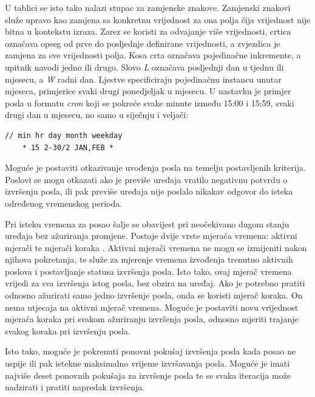 U tablici se isto tako nalazi stupac za zamjenske znakove. Zamjenski znakovi  služe upravo kao zamjena sa konkretnu vrijednost za ona polja čija vrijednost nije bitna u kontekstu izraza. Zarez se koristi za odvajanje više vrijednosti, crtica označava opseg od prve do posljednje definirane vrijednosti, a zvjezdica je zamjena za sve vrijednosti polja. Kosa crta označava pojedinačne inkremente, a upitnik navodi jedno ili drugo. Slovo \textit{L} označava posljednji dan u tjednu ili mjesecu, a \textit{W} radni dan. Ljestve specificiraju pojedinačnu instancu unutar mjeseca, primjerice svaki drugi ponedjeljak u mjesecu. U nastavku je primjer posla u formatu \textit{cron} koji se pokreće svake minute između 15:00 i 15:59, svaki drugi dan u mjesecu, no samo u siječnju i veljači:

\begin{lstlisting}[caption={Primjer formata tipa \textit{cron}}]
// min hr day month weekday
	* 15 2-30/2 JAN,FEB *
\end{lstlisting}

Moguće je postaviti otkazivanje uvođenja posla na temelju postavljenih kriterija. Poslovi se mogu otkazati ako je previše uređaja vratilo negativnu potvrdu o izvršenju posla, ili pak previše uređaja nije poslalo nikakav odgovor do isteka određenog vremenskog perioda. 

Pri isteku vremena  za posao šalje se obavijest pri neočekivano dugom stanju uređaja bez ažuriranja promjene. Postoje dvije vrste mjerača vremena: aktivni mjerači  te mjerači koraka . Aktivni mjerači vremena ne mogu se izmijeniti nakon njihova pokretanja, te služe za mjerenje vremena izvođenja trenutno aktivnih poslova i postavljanje statusa izvršenja posla. Isto tako, ovaj mjerač vremena vrijedi za sva izvršenja istog posla, bez obzira na uređaj. Ako je potrebno pratiti odnosno ažurirati samo jedno izvršenje posla, onda se koristi mjerač koraka. On nema utjecaja na aktivni mjerač vremena. Moguće je postaviti novu vrijednost mjerača koraka pri svakom ažuriranju izvršenja posla, odnosno mjeriti trajanje svakog koraka pri izvršenju posla. 

Isto tako, moguće je pokrenuti ponovni pokušaj izvršenja posla kada posao ne uspije ili pak istekne maksimalno vrijeme izvršavanja posla. Moguće je imati najviše deset ponovnih pokušaja za izvršenje posla te se svaka iteracija može nadzirati i pratiti napredak izvršenja. 

